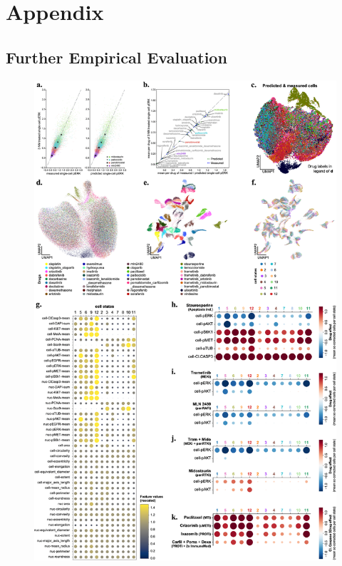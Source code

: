 \chapter{Appendix}
\label{cha:appendix}

\section{Further Empirical Evaluation}

\begin{figure}[H]
     \centering
     \includegraphics[height=.95\textheight ]{figures/fig_4i_analysis_extended.png}
\end{figure}
